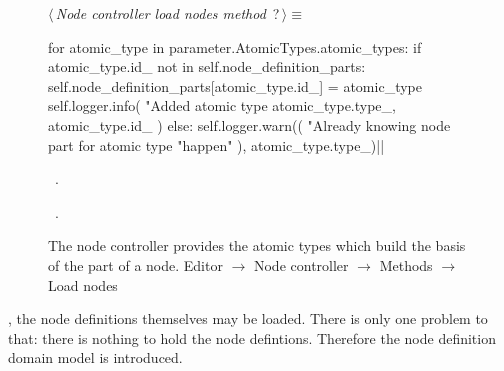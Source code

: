 \documentclass[%
    a4paper,    %
    justified,  %
    nobib,      %
    openany     %
]{tufte-book}
\begin{document}
\begin{figure}
\begin{flushleft} \small
\begin{minipage}{\linewidth}\label{scrap119}\raggedright\small
{} $\langle\,${\itshape Node controller load nodes method}\nobreak\ {\footnotesize {?}}$\,\rangle\equiv$
\vspace{-1ex}
\begin{pythoncode}
for atomic_type in parameter.AtomicTypes.atomic_types:
    if atomic_type.id_ not in self.node_definition_parts:
        self.node_definition_parts[atomic_type.id_] = atomic_type
        self.logger.info(
            "Added atomic type %
            atomic_type.type_, atomic_type.id_
        )
    else:
        self.logger.warn((
            "Already knowing node part for atomic type %
            "happen"
        ), atomic_type.type_)|\NWsep|
\end{pythoncode}
\vspace{1.5ex}
\footnotesize
\begin{list}{}{\setlength{\itemsep}{-\parsep}\setlength{\itemindent}{-\leftmargin}}
\item \NWtxtMacroDefBy\ .
\item \NWtxtMacroRefIn\ .

\item{}
\end{list}
\end{minipage}\vspace{4ex}
\end{flushleft}
\caption{The node controller provides the atomic types which build the basis of
  the part of a node.
  \newline{}\newline{}Editor $\rightarrow$ Node controller $\rightarrow$ Methods
  $\rightarrow$ Load nodes}
\label{editor:lst:node-controller:methods:load-nodes:atomic-types}
\end{figure}

, the node definitions
themselves may be loaded. There is only one problem to that: there is nothing to
hold the node defintions. Therefore the node definition domain model is
introduced.
\end{document}
